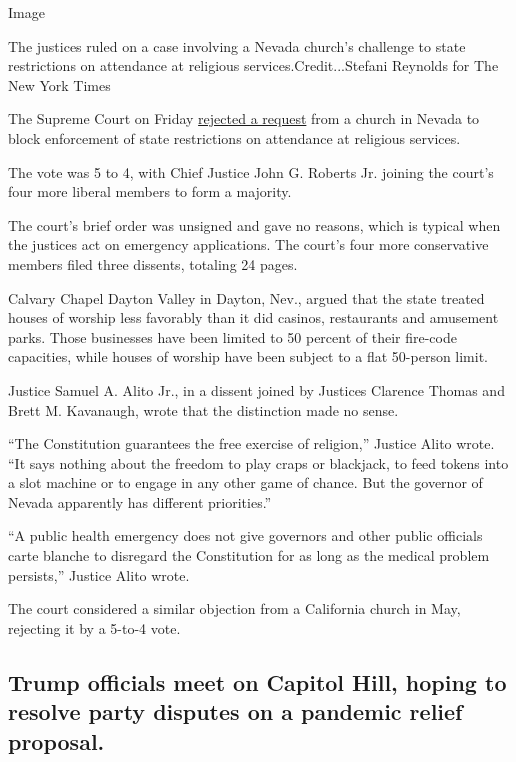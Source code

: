Image

The justices ruled on a case involving a Nevada church's challenge to
state restrictions on attendance at religious services.Credit...Stefani
Reynolds for The New York Times

The Supreme Court on Friday
\href{https://www.supremecourt.gov/opinions/19pdf/19a1070_08l1.pdf\#page=12\#page=13}{rejected
a request} from a church in Nevada to block enforcement of state
restrictions on attendance at religious services.

The vote was 5 to 4, with Chief Justice John G. Roberts Jr. joining the
court's four more liberal members to form a majority.

The court's brief order was unsigned and gave no reasons, which is
typical when the justices act on emergency applications. The court's
four more conservative members filed three dissents, totaling 24 pages.

Calvary Chapel Dayton Valley in Dayton, Nev., argued that the state
treated houses of worship less favorably than it did casinos,
restaurants and amusement parks. Those businesses have been limited to
50 percent of their fire-code capacities, while houses of worship have
been subject to a flat 50-person limit.

Justice Samuel A. Alito Jr., in a dissent joined by Justices Clarence
Thomas and Brett M. Kavanaugh, wrote that the distinction made no sense.

``The Constitution guarantees the free exercise of religion,'' Justice
Alito wrote. ``It says nothing about the freedom to play craps or
blackjack, to feed tokens into a slot machine or to engage in any other
game of chance. But the governor of Nevada apparently has different
priorities.''

``A public health emergency does not give governors and other public
officials carte blanche to disregard the Constitution for as long as the
medical problem persists,'' Justice Alito wrote.

The court considered a similar objection from a California church in
May, rejecting it by a 5-to-4 vote.

\hypertarget{trump-officials-meet-on-capitol-hill-hoping-to-resolve-party-disputes-on-a-pandemic-relief-proposal}{%
\subsection{Trump officials meet on Capitol Hill, hoping to resolve
party disputes on a pandemic relief
proposal.}\label{trump-officials-meet-on-capitol-hill-hoping-to-resolve-party-disputes-on-a-pandemic-relief-proposal}}

